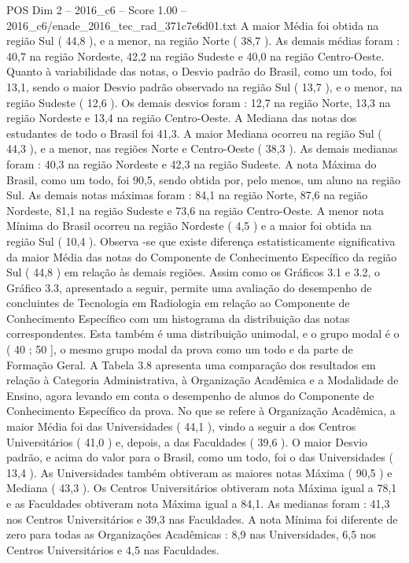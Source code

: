 \begin{textsample}{POS Dim 2 – 2016\_c6 – Score 1.00 – 2016\_c6/enade\_2016\_tec\_rad\_371c7e6d01.txt}
A maior Média foi obtida na região Sul ( 44,8 ), e a menor, na região Norte ( 38,7 ).
As demais médias foram : 40,7 na região Nordeste, 42,2 na região Sudeste e 40,0 na região Centro-Oeste.
Quanto à variabilidade das notas, o Desvio padrão do Brasil, como um todo, foi 13,1, sendo o maior Desvio padrão observado na região Sul ( 13,7 ), e o menor, na região Sudeste ( 12,6 ).
Os demais desvios foram : 12,7 na região Norte, 13,3 na região Nordeste e 13,4 na região Centro-Oeste.
A Mediana das notas dos estudantes de todo o Brasil foi 41,3.
A maior Mediana ocorreu na região Sul ( 44,3 ), e a menor, nas regiões Norte e Centro-Oeste ( 38,3 ).
As demais medianas foram : 40,3 na região Nordeste e 42,3 na região Sudeste.
A nota Máxima do Brasil, como um todo, foi 90,5, sendo obtida por, pelo menos, um aluno na região Sul.
As demais notas máximas foram : 84,1 na região Norte, 87,6 na região Nordeste, 81,1 na região Sudeste e 73,6 na região Centro-Oeste.
A menor nota Mínima do Brasil ocorreu na região Nordeste ( 4,5 ) e a maior foi obtida na região Sul ( 10,4 ).
Observa -se que existe diferença estatisticamente significativa da maior Média das notas do Componente de Conhecimento Específico da região Sul ( 44,8 ) em relação às demais regiões.
Assim como os Gráficos 3.1 e 3.2, o Gráfico 3.3, apresentado a seguir, permite uma avaliação do desempenho de concluintes de Tecnologia em Radiologia em relação ao Componente de Conhecimento Específico com um histograma da distribuição das notas correspondentes.
Esta também é uma distribuição unimodal, e o grupo modal é o ( 40 ; 50 ], o mesmo grupo modal da prova como um todo e da parte de Formação Geral.
A Tabela 3.8 apresenta uma comparação dos resultados em relação à Categoria Administrativa, à Organização Acadêmica e a Modalidade de Ensino, agora levando em conta o desempenho de alunos do Componente de Conhecimento Específico da prova.
No que se refere à Organização Acadêmica, a maior Média foi das Universidades ( 44,1 ), vindo a seguir a dos Centros Universitários ( 41,0 ) e, depois, a das Faculdades ( 39,6 ).
O maior Desvio padrão, e acima do valor para o Brasil, como um todo, foi o das Universidades ( 13,4 ).
As Universidades também obtiveram as maiores notas Máxima ( 90,5 ) e Mediana ( 43,3 ).
Os Centros Universitários obtiveram nota Máxima igual a 78,1 e as Faculdades obtiveram nota Máxima igual a 84,1.
As medianas foram : 41,3 nos Centros Universitários e 39,3 nas Faculdades.
A nota Mínima foi diferente de zero para todas as Organizações Acadêmicas : 8,9 nas Universidades, 6,5 nos Centros Universitários e 4,5 nas Faculdades.

\end{textsample}
